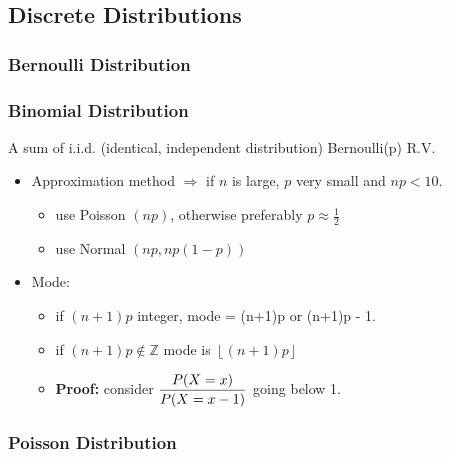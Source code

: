 \subsection*{Discrete Distributions}
\subsubsection*{Bernoulli Distribution}
\subsubsection*{Binomial Distribution}
A sum of i.i.d. (identical, independent distribution) Bernoulli(p) R.V.
\begin{itemize}
	\item Approximation method $\Rightarrow$ if $n$ is large, $p$ very small and $np < 10$.
	\begin{itemize}[label={--}]
		\item use Poisson $(np)$, otherwise preferably $p \approx \frac{1}{2}$
		\item use Normal $(np, np(1-p))$
	\end{itemize}
	\item Mode: 
	\begin{itemize}[label={--}]
		\item if $(n+1)p$ integer, mode = (n+1)p or (n+1)p - 1.
		\item if $(n+1)p \notin \mathbb{Z}$ mode is $\left \lfloor{(n+1)p}\right \rfloor$
		\item \textbf{Proof:} consider $\mathlarger{\frac{P(X=x)}{P(X=x-1)}}$ going below 1.
	\end{itemize}
\end{itemize}
\subsubsection*{Poisson Distribution}

